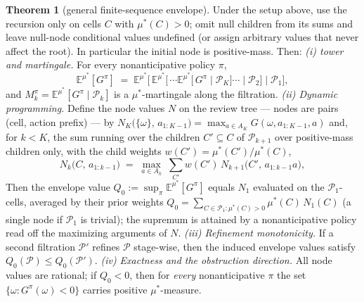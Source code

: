 \documentclass[10pt,twocolumn]{article}
\theoremstyle{definition}
\newtheorem{theorem}{Theorem}
\begin{document}
\begin{theorem}[general finite-sequence envelope]\label{thm:general}
Under the setup above, use the recursion only on cells
$C$ with $\mu^*(C)>0$; omit null children from its sums and leave
null-node conditional values undefined (or assign arbitrary values
that never affect the root). In particular the initial node is
positive-mass. Then: \emph{(i) tower and martingale.} For every
nonanticipative policy $\pi$,
\[
\mathbb{E}^{\mu^{*}}[G^{\pi}] \;=\;
\mathbb{E}^{\mu^{*}}\bigl[\, \mathbb{E}^{\mu^{*}}\bigl[\, \cdots
\mathbb{E}^{\mu^{*}}[\, G^{\pi} \mid \mathcal{P}_{K} \bigr] \cdots
\mid \mathcal{P}_{2} \bigr] \mid \mathcal{P}_{1} \bigr],
\]
and $M^{\pi}_{k} = \mathbb{E}^{\mu^{*}}[G^{\pi} \mid
\mathcal{P}_{k}]$ is a $\mu^{*}$-martingale along the filtration.
\emph{(ii) Dynamic programming.} Define the node values $N$ on the
review tree --- nodes are pairs (cell, action prefix) --- by
$N_{K}\bigl(\{\omega\},\, a_{1:K-1}\bigr) = \max_{a \in A_{K}}
G(\omega, a_{1:K-1}, a)$ and, for $k < K$, the sum running over the
children $C' \subseteq C$ of $\mathcal{P}_{k+1}$ over positive-mass children only, with the child weights
$w(C') = \mu^{*}(C')/\mu^{*}(C)$,
\[
N_{k}\bigl(C,\, a_{1:k-1}\bigr)
\;=\; \max_{a \in A_{k}} \;
\sum_{C'} w(C')\, N_{k+1}\bigl(C',\, a_{1:k-1}a\bigr),
\]
Then the envelope value $Q_{0} := \sup_{\pi}
\mathbb{E}^{\mu^{*}}[G^{\pi}]$ equals $N_{1}$ evaluated on the
$\mathcal{P}_{1}$-cells, averaged by their prior weights
$Q_{0} = \sum_{C \in \mathcal{P}_{1}:\mu^*(C)>0} \mu^{*}(C)\,
N_{1}(C)$ (a single node if $\mathcal{P}_{1}$ is trivial); the supremum
is attained by a nonanticipative policy read off the maximizing
arguments of $N$. \emph{(iii) Refinement monotonicity.} If a second
filtration $\mathcal{P}'$ refines $\mathcal{P}$ stage-wise, then the
induced envelope values satisfy $Q_{0}(\mathcal{P}) \le
Q_{0}(\mathcal{P}')$. \emph{(iv) Exactness and the obstruction
direction.} All node values are rational; if $Q_{0} < 0$, then for
\emph{every} nonanticipative $\pi$ the set
$\{\omega: G^{\pi}(\omega) < 0\}$ carries positive $\mu^{*}$-measure.
\end{theorem}
\end{document}
